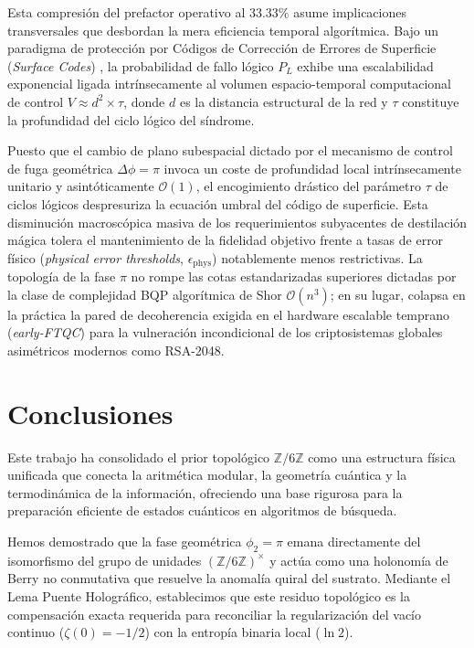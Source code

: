 \documentclass[12pt,a4paper]{article}
\theoremstyle{plain}
\theoremstyle{definition}
\theoremstyle{remark}
\begin{document}
Esta compresión del prefactor operativo al $33.33\%$ asume implicaciones transversales que desbordan la mera eficiencia temporal algorítmica. Bajo un paradigma de protección por Códigos de Corrección de Errores de Superficie (\textit{Surface Codes}) \cite{Fowler2012}, la probabilidad de fallo lógico $P_L$ exhibe una escalabilidad exponencial ligada intrínsecamente al volumen espacio-temporal computacional de control $V \approx d^2 \times \tau$, donde $d$ es la distancia estructural de la red y $\tau$ constituye la profundidad del ciclo lógico del síndrome.

Puesto que el cambio de plano subespacial dictado por el mecanismo de control de fuga geométrica $\Delta\phi = \pi$ invoca un coste de profundidad local intrínsecamente unitario y asintóticamente $\mathcal{O}(1)$, el encogimiento drástico del parámetro $\tau$ de ciclos lógicos despresuriza la ecuación umbral del código de superficie. Esta disminución macroscópica masiva de los requerimientos subyacentes de destilación mágica tolera el mantenimiento de la fidelidad objetivo frente a tasas de error físico (\textit{physical error thresholds}, $\epsilon_{\text{phys}}$) notablemente menos restrictivas. La topología de la fase $\pi$ no rompe las cotas estandarizadas superiores dictadas por la clase de complejidad BQP algorítmica de Shor $\mathcal{O}(n^3)$; en su lugar, colapsa en la práctica la pared de decoherencia exigida en el hardware escalable temprano (\textit{early-FTQC}) para la vulneración incondicional de los criptosistemas globales asimétricos modernos como RSA-2048.

\section{Conclusiones}
\label{sec:conclusiones}

Este trabajo ha consolidado el prior topológico $\mathbb{Z}/6\mathbb{Z}$ como una estructura física unificada que conecta la aritmética modular, la geometría cuántica y la termodinámica de la información, ofreciendo una base rigurosa para la preparación eficiente de estados cuánticos en algoritmos de búsqueda.

Hemos demostrado que la fase geométrica $\phi_2 = \pi$ emana directamente del isomorfismo del grupo de unidades $(\mathbb{Z}/6\mathbb{Z})^{\times}$ y actúa como una holonomía de Berry no conmutativa que resuelve la anomalía quiral del sustrato. Mediante el Lema Puente Holográfico, establecimos que este residuo topológico es la compensación exacta requerida para reconciliar la regularización del vacío continuo ($\zeta(0) = -1/2$) con la entropía binaria local ($\ln 2$). 
\end{document}
